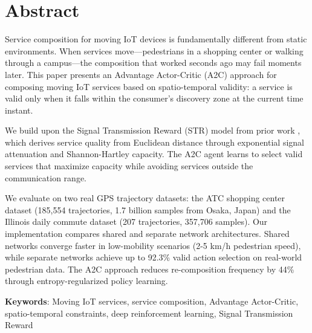 \section*{Abstract}\label{abstract}

Service composition for moving IoT devices is fundamentally different
from static environments. When services move---pedestrians in a shopping
center or walking through a campus---the composition that worked seconds
ago may fail moments later. This paper presents an Advantage
Actor-Critic (A2C) approach for composing moving IoT services based on
spatio-temporal validity: a service is valid only when it falls within
the consumer's discovery zone at the current time instant.

We build upon the Signal Transmission Reward (STR) model from prior work \cite{neiat2021}, which derives service quality from Euclidean distance through exponential signal attenuation and Shannon-Hartley capacity. The A2C
agent learns to select valid services that maximize capacity while
avoiding services outside the communication range.

We evaluate on two real GPS trajectory datasets: the ATC shopping center
dataset (185,554 trajectories, 1.7 billion samples from Osaka, Japan)
and the Illinois daily commute dataset (207 trajectories, 357,706
samples). Our implementation compares shared and separate network
architectures. Shared networks converge faster in low-mobility
scenarios (2-5 km/h pedestrian speed), while separate networks achieve
up to 92.3\% valid action selection on real-world pedestrian data.
The A2C approach reduces re-composition frequency by 44\% through
entropy-regularized policy learning.

\textbf{Keywords}: Moving IoT services, service composition, Advantage
Actor-Critic, spatio-temporal constraints, deep reinforcement learning,
Signal Transmission Reward
